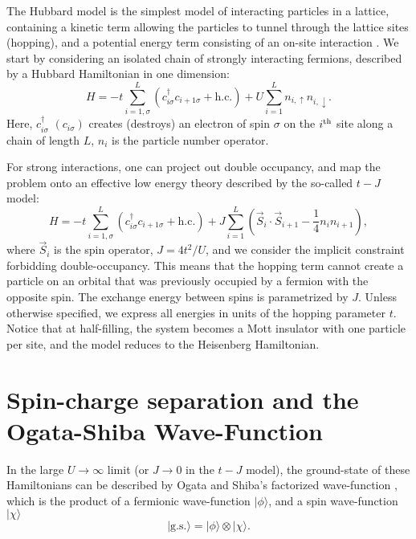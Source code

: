 \documentclass[article,11pt]{revtex4}
\begin{document}
The Hubbard model is the simplest model of interacting particles in a lattice, containing a kinetic term allowing the particles to tunnel through the lattice sites (hopping), and a potential energy term consisting of an on-site interaction \cite{J_Hubbard1963}.  We start by considering an isolated chain of strongly interacting fermions, described by a Hubbard Hamiltonian in one dimension:
\begin{equation}
H=-t \sum_{i=1,\sigma}^L \left(c^\dagger_{i\sigma} c_{i+1\sigma}+\mathrm{h.c.}\right)
+ U \sum_{i=1}^L n_{i,\uparrow} n_{i,\downarrow}.
\label{H_Hub}
\end{equation}
Here, $c^\dagger_{i\sigma}$ $(c_{i\sigma})$ creates (destroys) an electron of spin $\sigma$ on the
$i^{\rm th}$ site along a chain of length $L$, $n_i$ is the particle number operator.

For strong interactions, one can project out double occupancy, and map the problem onto an effective low energy theory described by the so-called $t-J$ model:
\begin{equation}
H=-t \sum_{i=1,\sigma}^L \left(c^\dagger_{i\sigma} c_{i+1\sigma}+\mathrm{h.c.}\right)
+ J \sum_{i=1}^L (\vec{S}_i \cdot \vec{S}_{i+1} -\frac{1}{4} n_i n_{i+1} ),
\label{H_t-J}
\end{equation}
where $\vec{S}_i$ is the spin operator, $J=4t^2/U$, and we consider the implicit constraint forbidding double-occupancy. This means that the hopping term cannot create a particle on an orbital that was previously occupied by a fermion with the opposite spin. 
 The exchange energy between spins is parametrized by $J$. Unless otherwise specified, we express all energies in units of the hopping parameter $t$. Notice that at half-filling, the system becomes a Mott insulator with one particle per site, and the model reduces to the Heisenberg Hamiltonian.

\pagebreak
\section {Spin-charge separation and the Ogata-Shiba Wave-Function}

In the large $U \rightarrow \infty$ limit (or $J \rightarrow 0$ in the $t-J$ model), the ground-state of these Hamiltonians can be described by Ogata and Shiba's factorized wave-function \cite{Ogata1990},
which is the product of a fermionic wave-function $|\phi\rangle$, and a spin wave-function
$|\chi\rangle$
\begin{equation}
|\mathrm{g.s.}\rangle=|\phi\rangle\otimes |\chi\rangle.
\label{gs}
\end{equation}
\end{document}
